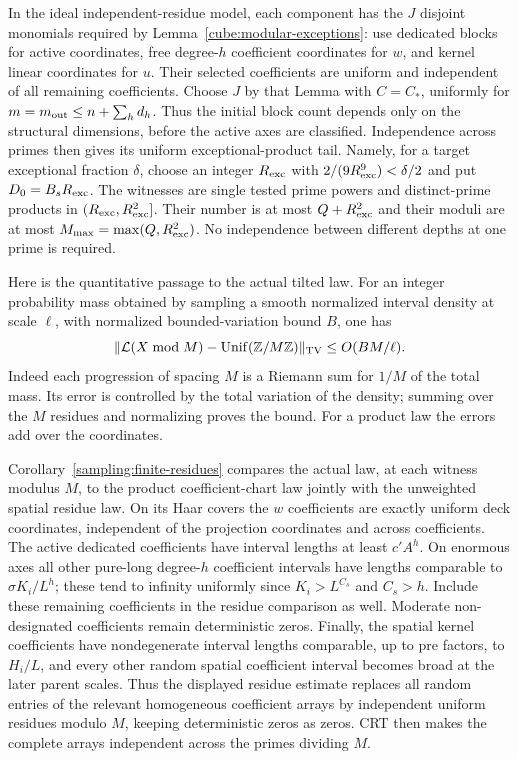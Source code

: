 In the ideal independent-residue model, each component has the $J$
disjoint monomials required by Lemma~\ref{cube:modular-exceptions}:
use dedicated blocks for active coordinates, free degree-$h$ coefficient
coordinates for $w$, and kernel linear coordinates for $u$.
Their selected coefficients are uniform and independent of all remaining
coefficients.  Choose $J$ by that Lemma with $C=C_*$, uniformly for
$m=m_{\rm out}\le n+\sum_h d_h$.  Thus the initial block count depends
only on the structural dimensions, before the active axes are classified.  Independence across primes then gives its
uniform exceptional-product tail.  Namely,
for a target exceptional fraction $\delta$, choose an integer
$R_{\rm exc}$ with $2/(9R_{\rm exc}^9)<\delta/2$ and put
$D_0=B_sR_{\rm exc}$.  The witnesses are single tested prime powers
and distinct-prime products in $(R_{\rm exc},R_{\rm exc}^2]$.
Their number is at most $Q+R_{\rm exc}^2$ and their moduli are at most
$M_{\max}=\max(Q,R_{\rm exc}^2)$.  No independence between different
depths at one prime is required.

Here is the quantitative passage to the actual tilted law.  For an
integer probability mass obtained by sampling a smooth normalized
interval density at scale $\ell$, with normalized bounded-variation
bound $B$, one has
\[
 \|\mathcal L(X\bmod M)-\operatorname{Unif}(\mathbb Z/M\mathbb Z)\|_{\rm TV}
       \le O(BM/\ell).
\]
Indeed each progression of spacing $M$ is a Riemann sum for
$1/M$ of the total mass.  Its error is controlled by the total
variation of the density; summing over the $M$ residues and
normalizing proves the bound.  For a product law the errors add
over the coordinates.

Corollary~\ref{sampling:finite-residues} compares the actual law, at
each witness modulus $M$, to the product coefficient-chart law jointly
with the unweighted spatial residue law.  On its Haar covers the
$w$ coefficients are exactly uniform deck coordinates, independent of
the projection coordinates and across coefficients.  The active
dedicated coefficients have interval lengths at least $c'A^h$.
On enormous axes all other pure-long degree-$h$ coefficient intervals
have lengths comparable to $\sigma K_i/L^h$; these tend to infinity
uniformly since $K_i>L^{C_s}$ and $C_s>h$.  Include these remaining
coefficients in the residue comparison as well.  Moderate
non-designated coefficients remain deterministic zeros.  Finally,
the spatial kernel coefficients have nondegenerate interval lengths
comparable, up to pre factors, to $H_i/L$, and every other random
spatial coefficient interval becomes broad at the later parent scales.
Thus the displayed residue estimate replaces all random entries of
the relevant homogeneous coefficient arrays by independent uniform
residues modulo $M$, keeping deterministic zeros as zeros.  CRT then
makes the complete arrays independent across the primes dividing $M$.

